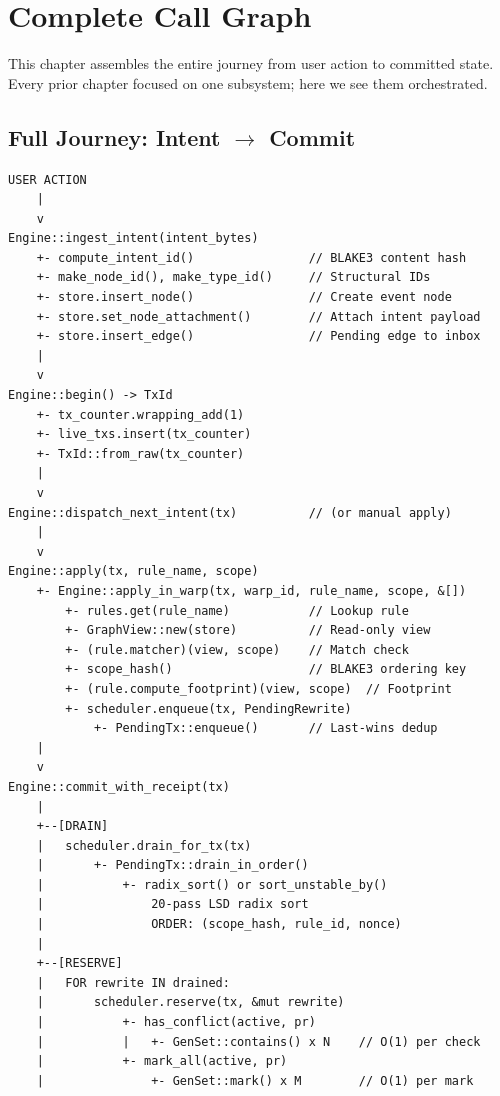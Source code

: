 \chapter{Complete Call Graph}

This chapter assembles the entire journey from user action to committed state.
Every prior chapter focused on one subsystem; here we see them orchestrated.

\section{Full Journey: Intent $\to$ Commit}

\begin{lstlisting}[style=callgraph]
USER ACTION
    |
    v
Engine::ingest_intent(intent_bytes)
    +- compute_intent_id()                // BLAKE3 content hash
    +- make_node_id(), make_type_id()     // Structural IDs
    +- store.insert_node()                // Create event node
    +- store.set_node_attachment()        // Attach intent payload
    +- store.insert_edge()                // Pending edge to inbox
    |
    v
Engine::begin() -> TxId
    +- tx_counter.wrapping_add(1)
    +- live_txs.insert(tx_counter)
    +- TxId::from_raw(tx_counter)
    |
    v
Engine::dispatch_next_intent(tx)          // (or manual apply)
    |
    v
Engine::apply(tx, rule_name, scope)
    +- Engine::apply_in_warp(tx, warp_id, rule_name, scope, &[])
        +- rules.get(rule_name)           // Lookup rule
        +- GraphView::new(store)          // Read-only view
        +- (rule.matcher)(view, scope)    // Match check
        +- scope_hash()                   // BLAKE3 ordering key
        +- (rule.compute_footprint)(view, scope)  // Footprint
        +- scheduler.enqueue(tx, PendingRewrite)
            +- PendingTx::enqueue()       // Last-wins dedup
    |
    v
Engine::commit_with_receipt(tx)
    |
    +--[DRAIN]
    |   scheduler.drain_for_tx(tx)
    |       +- PendingTx::drain_in_order()
    |           +- radix_sort() or sort_unstable_by()
    |               20-pass LSD radix sort
    |               ORDER: (scope_hash, rule_id, nonce)
    |
    +--[RESERVE]
    |   FOR rewrite IN drained:
    |       scheduler.reserve(tx, &mut rewrite)
    |           +- has_conflict(active, pr)
    |           |   +- GenSet::contains() x N    // O(1) per check
    |           +- mark_all(active, pr)
    |               +- GenSet::mark() x M        // O(1) per mark

\end{lstlisting}
